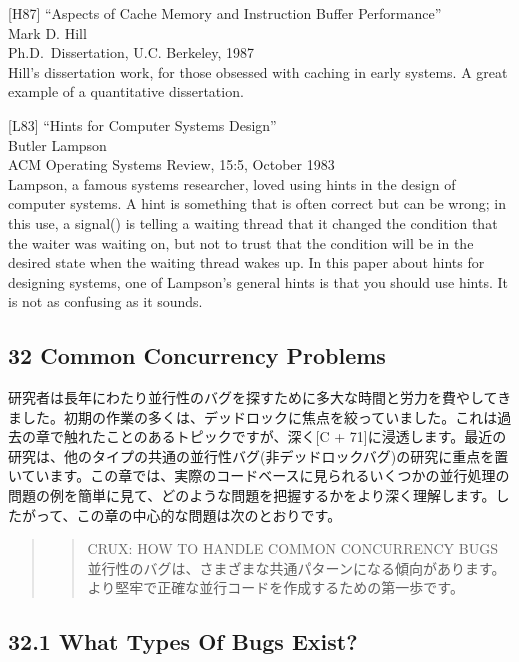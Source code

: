 {[}H87{]} ``Aspects of Cache Memory and Instruction Buffer
Performance''\\
Mark D. Hill\\
Ph.D.~Dissertation, U.C. Berkeley, 1987\\
Hill's dissertation work, for those obsessed with caching in early
systems. A great example of a quantitative dissertation.

{[}L83{]} ``Hints for Computer Systems Design''\\
Butler Lampson\\
ACM Operating Systems Review, 15:5, October 1983\\
Lampson, a famous systems researcher, loved using hints in the design of
computer systems. A hint is something that is often correct but can be
wrong; in this use, a signal() is telling a waiting thread that it
changed the condition that the waiter was waiting on, but not to trust
that the condition will be in the desired state when the waiting thread
wakes up. In this paper about hints for designing systems, one of
Lampson's general hints is that you should use hints. It is not as
confusing as it sounds.

\newpage

\hypertarget{common-concurrency-problems}{%
\subsection*{32 Common Concurrency
Problems}\label{common-concurrency-problems}}

研究者は長年にわたり並行性のバグを探すために多大な時間と労力を費やしてきました。初期の作業の多くは、デッドロックに焦点を絞っていました。これは過去の章で触れたことのあるトピックですが、深く{[}C
+
71{]}に浸透します。最近の研究は、他のタイプの共通の並行性バグ(非デッドロックバグ)の研究に重点を置いています。この章では、実際のコードベースに見られるいくつかの並行処理の問題の例を簡単に見て、どのような問題を把握するかをより深く理解します。したがって、この章の中心的な問題は次のとおりです。

\begin{quote}
\begin{quote}
CRUX: HOW TO HANDLE COMMON CONCURRENCY BUGS\\
並行性のバグは、さまざまな共通パターンになる傾向があります。より堅牢で正確な並行コードを作成するための第一歩です。
\end{quote}
\end{quote}

\hypertarget{what-types-of-bugs-exist}{%
\subsection*{32.1 What Types Of Bugs
Exist?}\label{what-types-of-bugs-exist}}

